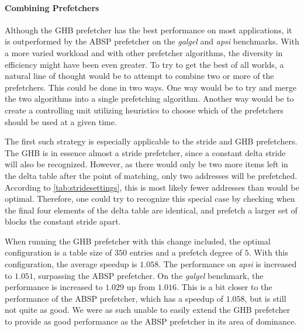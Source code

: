 \paragraph{Combining Prefetchers}
\label{par:prefcombo}
Although the GHB prefetcher has the best performance on most
applications, it is outperformed by the ABSP prefetcher on the \emph{galgel}
and \emph{apsi} benchmarks. With a more varied workload and with other
prefetcher algorithms, the diversity in efficiency might have been
even greater. To try to get the best of all worlds, a natural line of
thought would be to attempt to combine two or more of the
prefetchers. This could be done in two ways. One way would be to try
and merge the two algorithms into a single prefetching
algorithm. Another way would be to create a controlling unit utilizing
heuristics to choose which of the prefetchers should be used at a
given time.

The first such strategy is especially applicable to the stride and GHB
prefetchers. The GHB is in essence almost a stride prefetcher, since a
constant delta stride will also be recognized. However, as there would
only be two more items left in the delta table after the point of
matching, only two addresses will be prefetched. According to
\autoref{tab:stridesettings}, this is most likely fewer addresses than
would be optimal. Therefore, one could try to recognize this special
case by checking when the final four elements of the delta table are
identical, and prefetch a larger set of blocks the constant stride
apart.

When running the GHB prefetcher with this change included, the optimal
configuration is a table size of $350$ entries and a prefetch degree
of $5$. With this configuration, the average speedup is $1.058$. The
performance on \emph{apsi} is increased to $1.051$, surpassing the ABSP
prefetcher. On the \emph{galgel} benchmark, the performance is increased to
$1.029$ up from $1.016$. This is a bit closer to the performance of
the ABSP prefetcher, which has a speedup of $1.058$, but is still not
quite as good. We were as such unable to easily extend the GHB
prefetcher to provide as good performance as the ABSP prefetcher in
its area of dominance.
